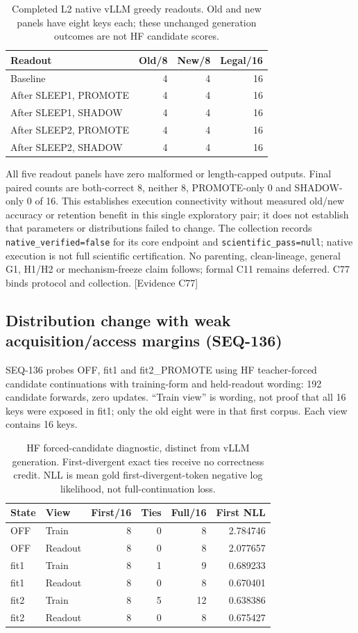 \documentclass[11pt]{article}
\newcommand{\ev}[1]{\textsf{[Evidence #1]}}
\begin{document}
\begin{table}[ht]
\centering
\caption{Completed L2 native vLLM greedy readouts. Old and new panels have eight
keys each; these unchanged generation outcomes are not HF candidate scores.}
\begin{tabular}{lrrr}
\toprule
Readout & Old/8 & New/8 & Legal/16 \\
\midrule
Baseline & 4 & 4 & 16 \\
After SLEEP1, PROMOTE & 4 & 4 & 16 \\
After SLEEP1, SHADOW & 4 & 4 & 16 \\
After SLEEP2, PROMOTE & 4 & 4 & 16 \\
After SLEEP2, SHADOW & 4 & 4 & 16 \\
\bottomrule
\end{tabular}
\end{table}

All five readout panels have zero malformed or length-capped outputs. Final
paired counts are both-correct 8, neither 8, PROMOTE-only 0 and SHADOW-only 0 of 16.
This establishes execution connectivity without measured old/new accuracy or
retention benefit in this single exploratory pair; it does not establish that
parameters or distributions failed to change. The collection records
\texttt{native\_verified=false} for its core endpoint and
\texttt{scientific\_pass=null}; native execution is not full scientific
certification. No parenting, clean-lineage, general G1, H1/H2 or mechanism-freeze
claim follows; formal C11 remains deferred. C77 binds protocol and collection. \ev{C77}

\subsection{Distribution change with weak acquisition/access margins (SEQ-136)}
SEQ-136 probes OFF, fit1 and fit2\_PROMOTE using HF teacher-forced candidate
continuations with training-form and held-readout wording: 192 candidate forwards,
zero updates. ``Train view'' is wording, not proof that all 16 keys were exposed
in fit1; only the old eight were in that first corpus. Each view contains 16 keys.

\begin{table}[ht]
\centering
\caption{HF forced-candidate diagnostic, distinct from vLLM generation.
First-divergent exact ties receive no correctness credit. NLL is mean gold
first-divergent-token negative log likelihood, not full-continuation loss.}
\begin{tabular}{llrrrr}
\toprule
State & View & First/16 & Ties & Full/16 & First NLL \\
\midrule
OFF & Train & 8 & 0 & 8 & 2.784746 \\
OFF & Readout & 8 & 0 & 8 & 2.077657 \\
fit1 & Train & 8 & 1 & 9 & 0.689233 \\
fit1 & Readout & 8 & 0 & 8 & 0.670401 \\
fit2 & Train & 8 & 5 & 12 & 0.638386 \\
fit2 & Readout & 8 & 0 & 8 & 0.675427 \\
\bottomrule
\end{tabular}
\end{table}
\end{document}
